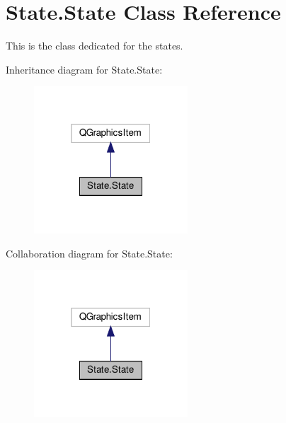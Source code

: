 \hypertarget{classState_1_1State}{}\section{State.\+State Class Reference}
\label{classState_1_1State}


This is the class dedicated for the states.  




Inheritance diagram for State.\+State\+:\nopagebreak
\begin{figure}[H]
\begin{center}
\leavevmode
\includegraphics[width=163pt]{classState_1_1State__inherit__graph}
\end{center}
\end{figure}


Collaboration diagram for State.\+State\+:\nopagebreak
\begin{figure}[H]
\begin{center}
\leavevmode
\includegraphics[width=163pt]{classState_1_1State__coll__graph}
\end{center}
\end{figure}
